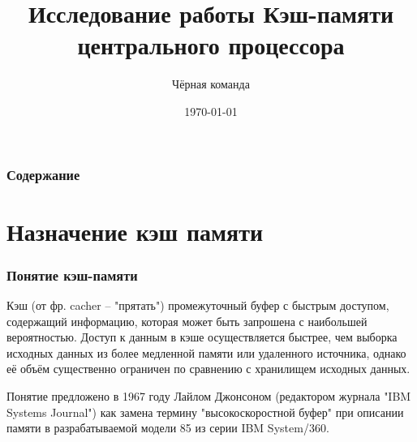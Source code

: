 \documentclass{beamer}
\title[Кэш-память]{Исследование работы Кэш-памяти\\ центрального процессора} %
\author{Чёрная команда} %
\institute[СПбПУ] %
{
Санкт-Петербургский политехнический университет Петра Великого \\ %
\medskip
\textit{Антон Абрамов <abramov91@mail.ru>\\
Владислав Бусаров <happyfanik@yandex.ru>\\
Сергей Дедков <dsv.mail@yandex.ru>\\
Семён Мартынов <semen.martynov@gmail.com>\\
Николай Патраков <noon.vlg@gmail.com>} %
}
\date{\today} %
\begin{document}
\begin{frame}
\titlepage %
\end{frame}

\begin{frame}
\frametitle{Содержание} %
\tableofcontents %
\end{frame}


\section{Назначение кэш памяти}

\begin{frame}
\frametitle{Понятие кэш-памяти}

\begin{block}{Кэш (от фр. cacher -- "прятать")}
промежуточный буфер с быстрым доступом, содержащий информацию, которая может быть запрошена с наибольшей вероятностью. Доступ к данным в кэше осуществляется быстрее, чем выборка исходных данных из более медленной памяти или удаленного источника, однако её объём существенно ограничен по сравнению с хранилищем исходных данных.
\end{block}

Понятие предложено в 1967 году Лайлом Джонсоном (редактором журнала "IBM Systems Journal") как замена термину "высокоскоростной буфер" при описании памяти в разрабатываемой модели 85 из серии IBM System/360.

\end{frame}

\end{document}
